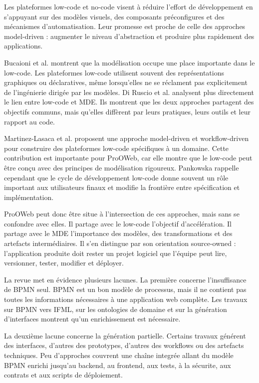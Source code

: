 
Les plateformes low-code et no-code visent à réduire l'effort de développement en s'appuyant sur des modèles visuels, des composants préconfigures et des mécanismes d'automatisation. Leur promesse est proche de celle des approches model-driven : augmenter le niveau d'abstraction et produire plus rapidement des applications.

Bucaioni et al. \cite{bucaioni2022} montrent que la modélisation occupe une place importante dans le low-code. Les plateformes low-code utilisent souvent des représentations graphiques ou déclaratives, même lorsqu'elles ne se réclament pas explicitement de l'ingénierie dirigée par les modèles. Di Ruscio et al. \cite{diruscio2022} analysent plus directement le lien entre low-code et MDE. Ils montrent que les deux approches partagent des objectifs communs, mais qu'elles diffèrent par leurs pratiques, leurs outils et leur rapport au code.

Martinez-Lasaca et al. \cite{martinez2026} proposent une approche model-driven et workflow-driven pour construire des plateformes low-code spécifiques à un domaine. Cette contribution est importante pour ProOWeb, car elle montre que le low-code peut être conçu avec des principes de modélisation rigoureux. Pankowska \cite{pankowska2024} rappelle cependant que le cycle de développement low-code donne souvent un rôle important aux utilisateurs finaux et modifie la frontière entre spécification et implémentation.

ProOWeb peut donc être situe à l'intersection de ces approches, mais sans se confondre avec elles. Il partage avec le low-code l'objectif d'accélération. Il partage avec le MDE l'importance des modèles, des transformations et des artefacts intermédiaires. Il s'en distingue par son orientation source-owned : l'application produite doit rester un projet logiciel que l'équipe peut lire, versionner, tester, modifier et déployer.


La revue met en évidence plusieurs lacunes. La première concerne l'insuffisance de BPMN seul. BPMN est un bon modèle de processus, mais il ne contient pas toutes les informations nécessaires à une application web complète. Les travaux sur BPMN vers IFML, sur les ontologies de domaine et sur la génération d'interfaces montrent qu'un enrichissement est nécessaire.

La deuxième lacune concerne la génération partielle. Certains travaux générent des interfaces, d'autres des prototypes, d'autres des workflows ou des artefacts techniques. Peu d'approches couvrent une chaîne integrée allant du modèle BPMN enrichi jusqu'au backend, au frontend, aux tests, à la sécurite, aux contrats et aux scripts de déploiement.

